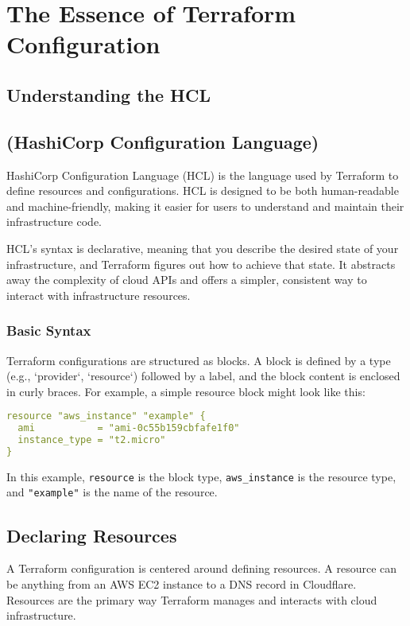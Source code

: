 \chapter{The Essence of Terraform Configuration}
\sloppy

\section{Understanding the HCL}
\section{(HashiCorp Configuration Language)}

HashiCorp Configuration Language (HCL) is the language used by Terraform to define resources and configurations. HCL is designed to be both human-readable and machine-friendly, making it easier for users to understand and maintain their infrastructure code.

HCL's syntax is declarative, meaning that you describe the desired state of your infrastructure, and Terraform figures out how to achieve that state. It abstracts away the complexity of cloud APIs and offers a simpler, consistent way to interact with infrastructure resources.

\subsection{Basic Syntax}

Terraform configurations are structured as blocks. A block is defined by a type (e.g., `provider`, `resource`) followed by a label, and the block content is enclosed in curly braces. For example, a simple resource block might look like this:

\begin{lstlisting}[language=yaml]
resource "aws_instance" "example" {
  ami           = "ami-0c55b159cbfafe1f0"
  instance_type = "t2.micro"
}
\end{lstlisting}

In this example, \texttt{resource} is the block type, \texttt{aws\_instance} is the resource type, and \texttt{"example"} is the name of the resource.

\section{Declaring Resources}

A Terraform configuration is centered around defining resources. A resource can be anything from an AWS EC2 instance to a DNS record in Cloudflare. Resources are the primary way Terraform manages and interacts with cloud infrastructure.

